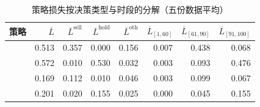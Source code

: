 \begin{table}[htbp]
\centering\small
\caption{策略损失按决策类型与时段的分解（五份数据平均）}\label{tab:loss}
\begin{tabular}{lrrrrrrr}
\toprule
策略 & $\overline{L}$ & $\overline L^{\mathrm{sell}}$ & $\overline L^{\mathrm{hold}}$ & $\overline L^{\mathrm{oth}}$ & $\overline L_{[1,60]}$ & $\overline L_{[61,90]}$ & $\overline L_{[91,100]}$ \\
\midrule
\Greedy{} & 0.513 & 0.357 & 0.000 & 0.156 & 0.007 & 0.438 & 0.068 \\
\LPFD{} & 0.572 & 0.010 & 0.530 & 0.032 & 0.003 & 0.093 & 0.476 \\
\LPDual{} & 0.169 & 0.112 & 0.010 & 0.046 & 0.003 & 0.099 & 0.067 \\
\IIDDP{} & 0.201 & 0.020 & 0.155 & 0.025 & 0.000 & 0.045 & 0.155 \\
\bottomrule
\end{tabular}
\end{table}
